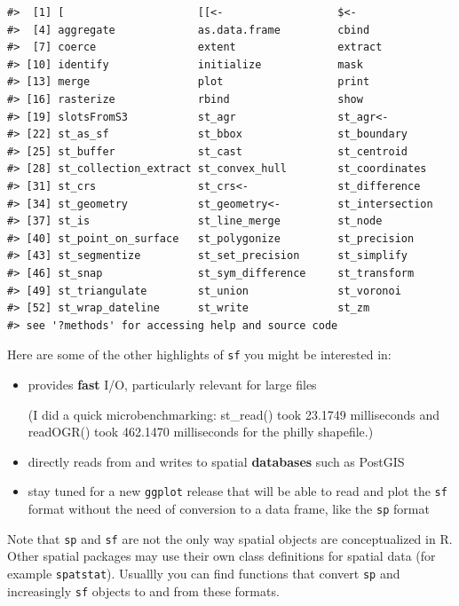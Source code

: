 \documentclass[]{book}
\theoremstyle{definition}
\theoremstyle{definition}
\theoremstyle{definition}
\theoremstyle{remark}
\begin{document}
\begin{verbatim}
#>  [1] [                     [[<-                  $<-                  
#>  [4] aggregate             as.data.frame         cbind                
#>  [7] coerce                extent                extract              
#> [10] identify              initialize            mask                 
#> [13] merge                 plot                  print                
#> [16] rasterize             rbind                 show                 
#> [19] slotsFromS3           st_agr                st_agr<-             
#> [22] st_as_sf              st_bbox               st_boundary          
#> [25] st_buffer             st_cast               st_centroid          
#> [28] st_collection_extract st_convex_hull        st_coordinates       
#> [31] st_crs                st_crs<-              st_difference        
#> [34] st_geometry           st_geometry<-         st_intersection      
#> [37] st_is                 st_line_merge         st_node              
#> [40] st_point_on_surface   st_polygonize         st_precision         
#> [43] st_segmentize         st_set_precision      st_simplify          
#> [46] st_snap               st_sym_difference     st_transform         
#> [49] st_triangulate        st_union              st_voronoi           
#> [52] st_wrap_dateline      st_write              st_zm                
#> see '?methods' for accessing help and source code
\end{verbatim}

Here are some of the other highlights of \texttt{sf} you might be
interested in:

\begin{itemize}
\item
  provides \textbf{fast} I/O, particularly relevant for large files

  (I did a quick microbenchmarking: st\_read() took 23.1749 milliseconds
  and readOGR() took 462.1470 milliseconds for the philly shapefile.)
\item
  directly reads from and writes to spatial \textbf{databases} such as
  PostGIS
\item
  stay tuned for a new \texttt{ggplot} release that will be able to read
  and plot the \texttt{sf} format without the need of conversion to a
  data frame, like the \texttt{sp} format
\end{itemize}

Note that \texttt{sp} and \texttt{sf} are not the only way spatial
objects are conceptualized in R. Other spatial packages may use their
own class definitions for spatial data (for example \texttt{spatstat}).
Usuallly you can find functions that convert \texttt{sp} and
increasingly \texttt{sf} objects to and from these formats.
\end{document}
